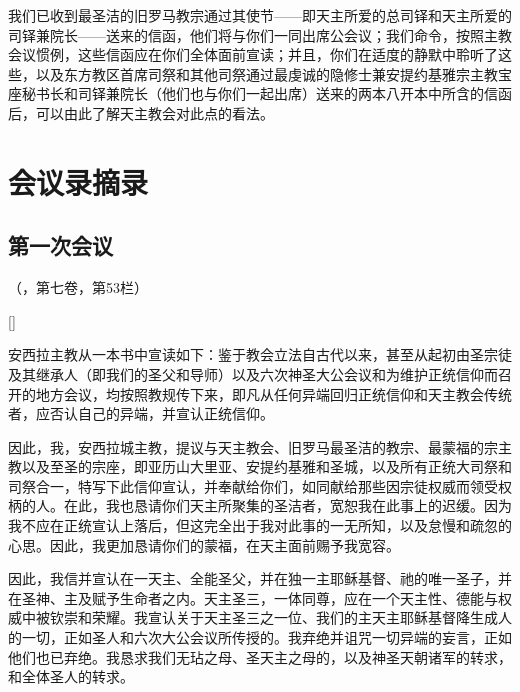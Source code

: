 我们已收到最圣洁的旧罗马教宗通过其使节——即天主所爱的总司铎和天主所爱的司铎兼院长——送来的信函，他们将与你们一同出席公会议；我们命令，按照主教会议惯例，这些信函应在你们全体面前宣读；并且，你们在适度的静默中聆听了这些，以及东方教区首席司祭和其他司祭通过最虔诚的隐修士兼安提约基雅宗主教宝座秘书长和司铎兼院长（他们也与你们一起出席）送来的两本八开本中所含的信函后，可以由此了解天主教会对此点的看法。\par


\section{会议录摘录}


\subsection{第一次会议}

（，第七卷，第53栏）\par

[]\par

安西拉主教从一本书中宣读如下：鉴于教会立法自古代以来，甚至从起初由圣宗徒及其继承人（即我们的圣父和导师）以及六次神圣大公会议和为维护正统信仰而召开的地方会议，均按照教规传下来，即凡从任何异端回归正统信仰和天主教会传统者，应否认自己的异端，并宣认正统信仰。\par

因此，我，安西拉城主教，提议与天主教会、旧罗马最圣洁的教宗、最蒙福的宗主教以及至圣的宗座，即亚历山大里亚、安提约基雅和圣城，以及所有正统大司祭和司祭合一，特写下此信仰宣认，并奉献给你们，如同献给那些因宗徒权威而领受权柄的人。在此，我也恳请你们天主所聚集的圣洁者，宽恕我在此事上的迟缓。因为我不应在正统宣认上落后，但这完全出于我对此事的一无所知，以及怠慢和疏忽的心思。因此，我更加恳请你们的蒙福，在天主面前赐予我宽容。\par

因此，我信并宣认在一天主、全能圣父，并在独一主耶稣基督、祂的唯一圣子，并在圣神、主及赋予生命者之内。天主圣三，一体同尊，应在一个天主性、德能与权威中被钦崇和荣耀。我宣认关于天主圣三之一位、我们的主天主耶稣基督降生成人的一切，正如圣人和六次大公会议所传授的。我弃绝并诅咒一切异端的妄言，正如他们也已弃绝。我恳求我们无玷之母、圣天主之母的，以及神圣天朝诸军的转求，和全体圣人的转求。\par

